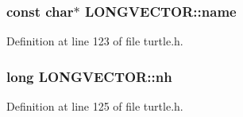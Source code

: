 \hypertarget{struct_l_o_n_g_v_e_c_t_o_r_a16a7061f53bb42703ef57db54d5909ac}{
\subsubsection[{name}]{\setlength{\rightskip}{0pt plus 5cm}const char$\ast$ L\-O\-N\-G\-V\-E\-C\-T\-O\-R\-::name}}\label{struct_l_o_n_g_v_e_c_t_o_r_a16a7061f53bb42703ef57db54d5909ac}


Definition at line 123 of file turtle.\-h.

\hypertarget{struct_l_o_n_g_v_e_c_t_o_r_ac39f7d4fdc7e3886bcd38177fc6eb4fc}{
\subsubsection[{nh}]{\setlength{\rightskip}{0pt plus 5cm}long L\-O\-N\-G\-V\-E\-C\-T\-O\-R\-::nh}}\label{struct_l_o_n_g_v_e_c_t_o_r_ac39f7d4fdc7e3886bcd38177fc6eb4fc}


Definition at line 125 of file turtle.\-h.



